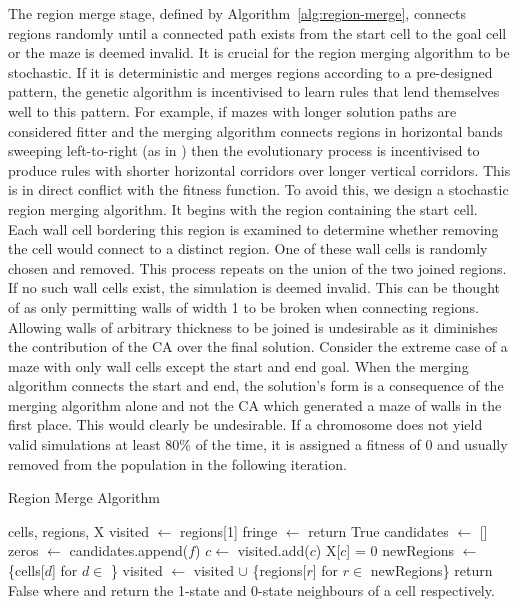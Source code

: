 The region merge stage, defined by Algorithm~\ref{alg:region-merge}, connects regions randomly until a connected path exists from the start cell to the goal cell or the maze is deemed invalid. It is crucial for the region merging algorithm to be stochastic. If it is deterministic and merges regions according to a pre-designed pattern, the genetic algorithm is incentivised to learn rules that lend themselves well to this pattern. For example, if mazes with longer solution paths are considered fitter and the merging algorithm connects regions in horizontal bands sweeping left-to-right (as in \cite{adams2018evolving}) then the evolutionary process is incentivised to produce rules with shorter horizontal corridors over longer vertical corridors. This is in direct conflict with the fitness function. To avoid this, we design a stochastic region merging algorithm. It begins with the region containing the start cell. Each wall cell bordering this region is examined to determine whether removing the cell would connect to a distinct region. One of these wall cells is randomly chosen and removed. This process repeats on the union of the two joined regions. If no such wall cells exist, the simulation is deemed invalid. This can be thought of as only permitting walls of width 1 to be broken when connecting regions. Allowing walls of arbitrary thickness to be joined is undesirable as it diminishes the contribution of the CA over the final solution. Consider the extreme case of a maze with only wall cells except the start and end goal. When the merging algorithm connects the start and end, the solution's form is a consequence of the merging algorithm alone and not the CA which generated a maze of walls in the first place. This would clearly be undesirable. If a chromosome does not yield valid simulations at least 80\% of the time, it is assigned a fitness of 0 and usually removed from the population in the following iteration.

\begin{algorithm}
  \caption{Region Merge Algorithm}\label{alg:region-merge}
  \begin{algorithmic}
  \Require cells, regions, X
  \State visited $\gets$ regions[1]
    \State fringe $\gets$ 
        \State return True 
    \EndIf
    \State candidates $\gets$ []
        \State zeros $\gets$ 
            \State candidates.append($f$)
        \EndIf
    \EndFor
        \State $c \gets$ 
        \State visited.add($c$)
        \State X[$c$] = 0
        \State newRegions $\gets$ \{cells[$d$] for $d \in$ \}
        \State visited $\gets$ visited $\cup$ \{regions[$r$] for $r \in$ newRegions\}
    \Else
        \State return False 
    \EndIf
  \EndWhile
  \State
  \State where  and  return the 1-state and 0-state neighbours of a cell respectively.
  \end{algorithmic}
\end{algorithm}

